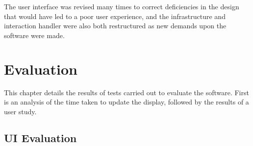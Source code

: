 \documentclass[12pt,twoside,notitlepage,xetex]{report}
\begin{document}
{The user interface was revised many times to correct deficiencies in the design that would have led to a poor user experience, and the infrastructure and interaction handler were also both restructured as new demands upon the software were made.

\cleardoublepage
\chapter{Evaluation}

This chapter details the results of tests carried out to evaluate the software.  First is an analysis of the time taken to update the display, followed by the results of a user study.

%
%
\section{UI Evaluation}

}
\end{document}
